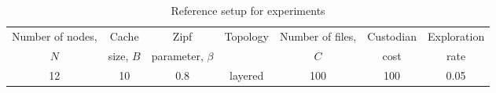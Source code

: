 \begin{comment}
\begin{table}[h]
\centering
\begin{tabular}{c |c|c|c|c|c|c|c}
\hline
 Experiment  & Nodes & Cache & Zipf & Topology & Files & Custodian & Exploration \\            &        &  Size & parameter & &  &Cost & Rate \\
 \ref{sub:exp}& 24 & 10 & 0.8 & layered & 100 & 100 & variable\\
 \ref{sub:space_diversity}& $2^{l+1}-1$ & 10 & 0.8 & tree & 100 & 100 &0.05 \\
 \ref{sub:cost_aware}& 12 & 10 & 0.8 & layered & 100 & variable &0.05\\
 \ref{sub:locality}& 12 & 10 & 0.8 & layered & 100 & 100 &0.05 \\
 \ref{sub:size}& 12 & variable & 0.8 & layered & 100 & 100 &0.05\\
  Zipf& 12 & 10 & variable & layered & 100 & 100 &0.05\\
 \hline
 \hline

\hline
\end{tabular}
\vspace{-0.1in}
\caption{Parameters used in experiments}
\label{tab:experiments}
\end{table}

\end{comment}


\setlength{\tabcolsep}{2pt} 


\begin{table}[h]
\centering
\footnotesize
\begin{tabular}{c|c|c|c|c|c|c}
\hline
  Number of nodes, & Cache & Zipf & Topology & Number of files, & Custodian & Exploration \\            
     $N$   &  size, $B$ & parameter, $\beta$ &  &  $C$ &cost & rate \\
  \hline
12 & 10 & 0.8 & layered & 100 & 100 &0.05 \\
 \hline
 \hline

\hline
\end{tabular}
\vspace{-0.1in}
\caption{Reference setup for experiments}
\label{tab:experiments}
\vspace{-0.2in}
\end{table}







